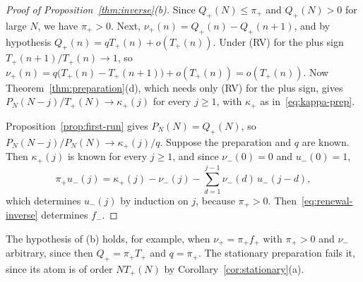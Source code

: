 \begin{proof}[Proof of Proposition~\ref{thm:inverse}(b)]
Since $Q_\plus(N)\le\pi_\plus$ and $Q_\plus(N)>0$ for large $N$, we have $\pi_\plus>0$.
Next, $\nu_\plus(n)=Q_\plus(n)-Q_\plus(n+1)$, and by hypothesis
$Q_\plus(n)=qT_\plus(n)+o(T_\plus(n))$. Under (RV) for the plus sign
$T_\plus(n+1)/T_\plus(n)\to1$, so
$\nu_\plus(n)=q\bigl(T_\plus(n)-T_\plus(n+1)\bigr)+o(T_\plus(n))=o(T_\plus(n))$. Now
Theorem~\ref{thm:preparation}(d), which needs only (RV) for the plus sign, gives
$P_N(N-j)/T_\plus(N)\to\kappa_\plus(j)$ for every $j\ge1$, with $\kappa_\plus$ as
in~\eqref{eq:kappa-prep}.

Proposition~\ref{prop:first-run} gives $P_N(N)=Q_\plus(N)$, so
$P_N(N-j)/P_N(N)\to\kappa_\plus(j)/q$. Suppose the preparation and $q$ are
known. Then $\kappa_\plus(j)$ is known for every $j\ge1$, and since
$\nu_\minus(0)=0$ and $u_\minus(0)=1$,
\[
 \pi_\plus u_\minus(j)=\kappa_\plus(j)-\nu_\minus(j)-\sum_{d=1}^{j-1}\nu_\minus(d)\,u_\minus(j-d),
\]
which determines $u_\minus(j)$ by induction on $j$, because $\pi_\plus>0$.
Then~\eqref{eq:renewal-inverse} determines $f_\minus$.
\end{proof}

The hypothesis of (b) holds, for example, when $\nu_\plus=\pi_\plus f_\plus$ with
$\pi_\plus>0$ and $\nu_\minus$ arbitrary, since then $Q_\plus=\pi_\plus T_\plus$ and
$q=\pi_\plus$. The stationary preparation fails it, since its atom is of order
$NT_\plus(N)$ by Corollary~\ref{cor:stationary}(a).
